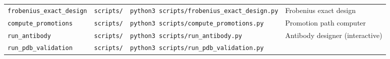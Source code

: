 \documentclass[12pt,a4paper]{article}
\begin{document}
\begin{longtable}[]{@{}llll@{}}
\begin{minipage}[t]{0.17\columnwidth}
\texttt{frobenius\_exact\_design}\strut
\end{minipage} & \begin{minipage}[t]{0.24\columnwidth}\raggedright
\texttt{scripts/}\strut
\end{minipage} & \begin{minipage}[t]{0.19\columnwidth}\raggedright
\texttt{python3\ scripts/frobenius\_exact\_design.py}\strut
\end{minipage} & \begin{minipage}[t]{0.28\columnwidth}\raggedright
Frobenius exact design\strut
\end{minipage}\tabularnewline
\begin{minipage}[t]{0.17\columnwidth}\raggedright
\texttt{compute\_promotions}\strut
\end{minipage} & \begin{minipage}[t]{0.24\columnwidth}\raggedright
\texttt{scripts/}\strut
\end{minipage} & \begin{minipage}[t]{0.19\columnwidth}\raggedright
\texttt{python3\ scripts/compute\_promotions.py}\strut
\end{minipage} & \begin{minipage}[t]{0.28\columnwidth}\raggedright
Promotion path computer\strut
\end{minipage}\tabularnewline
\begin{minipage}[t]{0.17\columnwidth}\raggedright
\texttt{run\_antibody}\strut
\end{minipage} & \begin{minipage}[t]{0.24\columnwidth}\raggedright
\texttt{scripts/}\strut
\end{minipage} & \begin{minipage}[t]{0.19\columnwidth}\raggedright
\texttt{python3\ scripts/run\_antibody.py}\strut
\end{minipage} & \begin{minipage}[t]{0.28\columnwidth}\raggedright
Antibody designer (interactive)\strut
\end{minipage}\tabularnewline
\begin{minipage}[t]{0.17\columnwidth}\raggedright
\texttt{run\_pdb\_validation}\strut
\end{minipage} & \begin{minipage}[t]{0.24\columnwidth}\raggedright
\texttt{scripts/}\strut
\end{minipage} & \begin{minipage}[t]{0.19\columnwidth}\raggedright
\texttt{python3\ scripts/run\_pdb\_validation.py}\strut

\end{minipage}
\end{longtable}
\end{document}

